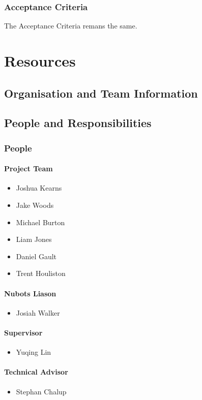 \documentclass[a4paper]{article}
\begin{document}
			\subsubsection{Acceptance Criteria}
				The Acceptance Criteria remans the same.

	\section{Resources}
		\subsection{Organisation and Team Information}
		\subsection{People and Responsibilities}
			\subsubsection{People}
				\paragraph{Project Team}
					\begin{itemize}
						\item Joshua Kearns
						\item Jake Woods
						\item Michael Burton
						\item Liam Jones
						\item Daniel Gault
						\item Trent Houliston
					\end{itemize}
				\paragraph{Nubots Liason}
					\begin{itemize}
						\item Josiah Walker
					\end{itemize}
				\paragraph{Supervisor}
					\begin{itemize}
						\item Yuqing Lin
					\end{itemize}
				\paragraph{Technical Advisor}
					\begin{itemize}
						\item Stephan Chalup
					\end{itemize}
\end{document}
